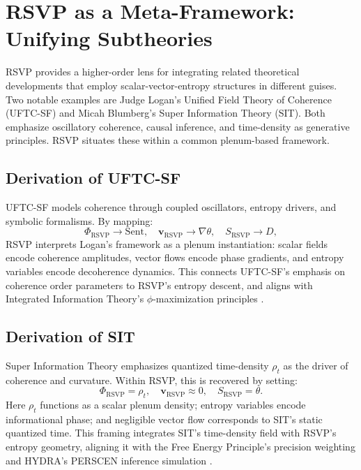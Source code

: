 \documentclass[12pt]{report}
\begin{document}
\chapter{RSVP as a Meta-Framework: Unifying Subtheories}
RSVP provides a higher-order lens for integrating related theoretical developments that employ scalar-vector-entropy structures in different guises. Two notable examples are Judge Logan’s Unified Field Theory of Coherence (UFTC-SF) and Micah Blumberg’s Super Information Theory (SIT). Both emphasize oscillatory coherence, causal inference, and time-density as generative principles. RSVP situates these within a common plenum-based framework.

\section{Derivation of UFTC-SF}
UFTC-SF models coherence through coupled oscillators, entropy drivers, and symbolic formalisms. By mapping:
\[
\Phi_{\text{RSVP}} \to \mathrm{Sent}, \quad \mathbf{v}_{\text{RSVP}} \to \nabla \theta, \quad S_{\text{RSVP}} \to D,
\]
RSVP interprets Logan’s framework as a plenum instantiation: scalar fields encode coherence amplitudes, vector flows encode phase gradients, and entropy variables encode decoherence dynamics. This connects UFTC-SF’s emphasis on coherence order parameters to RSVP’s entropy descent, and aligns with Integrated Information Theory’s \(\phi\)-maximization principles \citep{Tononi2016, Logan2025}.

\section{Derivation of SIT}
Super Information Theory emphasizes quantized time-density \(\rho_t\) as the driver of coherence and curvature. Within RSVP, this is recovered by setting:
\[
\Phi_{\text{RSVP}} = \rho_t, \quad \mathbf{v}_{\text{RSVP}} \approx 0, \quad S_{\text{RSVP}} = \theta.
\]
Here \(\rho_t\) functions as a scalar plenum density; entropy variables encode informational phase; and negligible vector flow corresponds to SIT’s static quantized time. This framing integrates SIT’s time-density field with RSVP’s entropy geometry, aligning it with the Free Energy Principle’s precision weighting \citep{Friston2010, Blumberg2025} and HYDRA’s PERSCEN inference simulation \citep{Du2025PERSCEN}.
\end{document}
